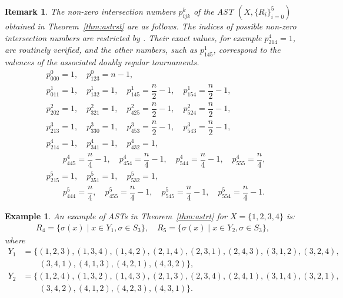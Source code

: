 \documentclass[11pt,oneside]{amsart}
\newtheorem{remark}[theorem]{Remark}
\newtheorem{example}[theorem]{Example}
\begin{document}
{\begin{remark}\label{rem:number_srt}
\textup{The non-zero intersection numbers $p_{ijk}^k$ of the AST $(X,\{R_i\}_{i=0}^5)$ obtained in Theorem~\ref{thm:astrst} 
are as follows. 
The indices of possible non-zero intersection numbers are restricted by \cite[Proposition~2.7] {MR1272106}. Their exact values, for example $p_{214}^4=1$, are routinely verified, and the other numbers, such as $p_{145}^1$, correspond to the valences of the associated doubly regular tournaments.  
\[
\begin{aligned}
& p_{000}^0 = 1,\quad p_{123}^0 = n-1,\\[4pt]
& p_{011}^1 = 1,\quad p_{132}^1 = 1,\quad p_{145}^1 = \dfrac{n}{2}-1,\quad p_{154}^1 = \dfrac{n}{2}-1,\\[4pt]
& p_{202}^2 = 1,\quad p_{321}^2 = 1,\quad p_{425}^2 = \dfrac{n}{2}-1,\quad p_{524}^2 = \dfrac{n}{2}-1,\\[4pt]
& p_{213}^3 = 1,\quad p_{330}^3 = 1,\quad p_{453}^3 = \dfrac{n}{2}-1,\quad p_{543}^3 = \dfrac{n}{2}-1,\\[4pt]
& p_{214}^4 = 1,\quad p_{341}^4 = 1,\quad p_{432}^4 = 1,\\
& \qquad p_{445}^4 = \dfrac{n}{4}-1,\quad p_{454}^4 = \dfrac{n}{4}-1,\quad p_{544}^4 = \dfrac{n}{4}-1,\quad p_{555}^4 = \dfrac{n}{4},\\[4pt]
& p_{215}^5 = 1,\quad p_{351}^5 = 1,\quad p_{532}^5 = 1,\\
& \qquad p_{444}^5 = \dfrac{n}{4},\quad p_{455}^5 = \dfrac{n}{4}-1,\quad p_{545}^5 = \dfrac{n}{4}-1,\quad p_{554}^5 = \dfrac{n}{4}-1.
\end{aligned}
\]
}\end{remark}
\begin{example}\textup{
    An example of ASTs in Theorem~\ref{thm:astrt} for $X=\{1,2,3,4\}$ is:
    \begin{align*}
        R_4=\{\sigma(x) \mid x\in Y_1,\sigma \in S_3\},\quad 
        R_5=\{\sigma(x) \mid x\in Y_2,\sigma \in S_3\},
    \end{align*}
    where 
    \begin{align*}
        Y_1&=\{(1, 2, 3), (1, 3, 4), (1, 4, 2), (2, 1, 4), (2, 3, 1), (2, 4, 3), (3,
   1, 2), (3, 2, 4), \\
   &\quad\quad(3, 4, 1), (4, 1, 3), (4, 2, 1), (4, 3, 2)\},\\
   Y_2&=\{(1, 2, 4), (1, 3, 2), (1, 4, 3), (2, 1, 3), (2, 3, 4), (2, 4, 1), (3,
   1, 4), (3, 2, 1), \\
   &\quad\quad(3, 4, 2), (4, 1, 2), (4, 2, 3), (4, 3, 1)\}.
    \end{align*}
}\end{example}


}
\end{document}

